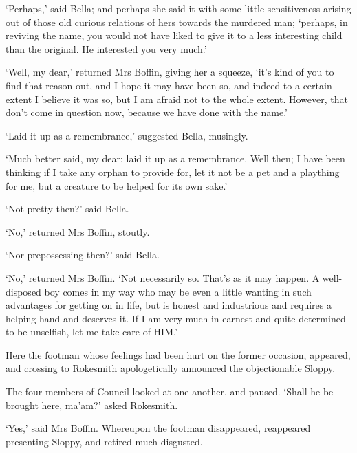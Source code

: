 ‘Perhaps,’ said Bella; and perhaps she said it with some little
sensitiveness arising out of those old curious relations of hers towards
the murdered man; ‘perhaps, in reviving the name, you would not have
liked to give it to a less interesting child than the original. He
interested you very much.’

‘Well, my dear,’ returned Mrs Boffin, giving her a squeeze, ‘it’s kind
of you to find that reason out, and I hope it may have been so, and
indeed to a certain extent I believe it was so, but I am afraid not to
the whole extent. However, that don’t come in question now, because we
have done with the name.’

‘Laid it up as a remembrance,’ suggested Bella, musingly.

‘Much better said, my dear; laid it up as a remembrance. Well then; I
have been thinking if I take any orphan to provide for, let it not be
a pet and a plaything for me, but a creature to be helped for its own
sake.’

‘Not pretty then?’ said Bella.

‘No,’ returned Mrs Boffin, stoutly.

‘Nor prepossessing then?’ said Bella.

‘No,’ returned Mrs Boffin. ‘Not necessarily so. That’s as it may happen.
A well-disposed boy comes in my way who may be even a little wanting in
such advantages for getting on in life, but is honest and industrious
and requires a helping hand and deserves it. If I am very much in
earnest and quite determined to be unselfish, let me take care of HIM.’

Here the footman whose feelings had been hurt on the former occasion,
appeared, and crossing to Rokesmith apologetically announced the
objectionable Sloppy.

The four members of Council looked at one another, and paused. ‘Shall he
be brought here, ma’am?’ asked Rokesmith.

‘Yes,’ said Mrs Boffin. Whereupon the footman disappeared, reappeared
presenting Sloppy, and retired much disgusted.

